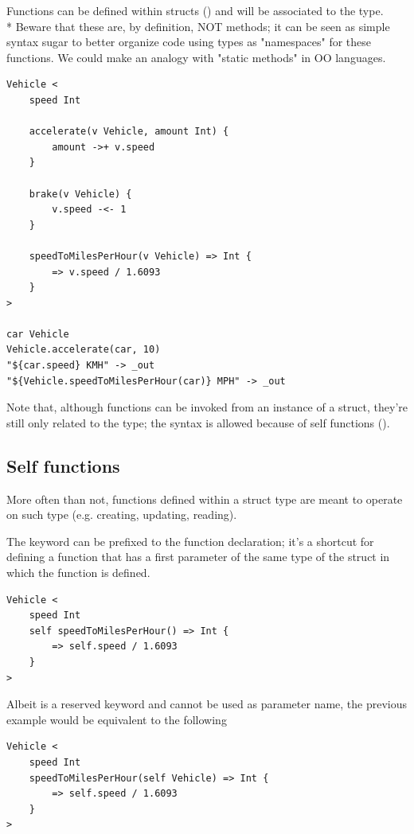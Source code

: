 Functions can be defined within structs () and will be
associated to the type.\\*
Beware that these are, by definition, NOT methods; it can be seen as simple
syntax sugar to better organize code using types as "namespaces" for these
functions. We could make an analogy with "static methods" in OO languages.

\begin{verbatim}
Vehicle <
	speed Int

	accelerate(v Vehicle, amount Int) {
		amount ->+ v.speed
	}

	brake(v Vehicle) {
		v.speed -<- 1
	}

	speedToMilesPerHour(v Vehicle) => Int {
		=> v.speed / 1.6093
	}
>

car Vehicle
Vehicle.accelerate(car, 10)
"${car.speed} KMH" -> _out
"${Vehicle.speedToMilesPerHour(car)} MPH" -> _out
\end{verbatim}

Note that, although functions can be invoked from an instance of a struct,
they're still only related to the type; the syntax is allowed because of self
functions ().

\subsection{Self functions}
\label{sec:self_func}

More often than not, functions defined within a struct type are meant to
operate on such type (e.g. creating, updating, reading).

The  keyword can be prefixed to the function declaration; it's a
shortcut for defining a function that has a first parameter of the same type of
the struct in which the function is defined.

\begin{verbatim}
Vehicle <
	speed Int
	self speedToMilesPerHour() => Int {
		=> self.speed / 1.6093
	}
>
\end{verbatim}

Albeit  is a reserved keyword and cannot be used as parameter name,
the previous example would be equivalent to the following

\begin{verbatim}
Vehicle <
	speed Int
	speedToMilesPerHour(self Vehicle) => Int {
		=> self.speed / 1.6093
	}
>
\end{verbatim}

